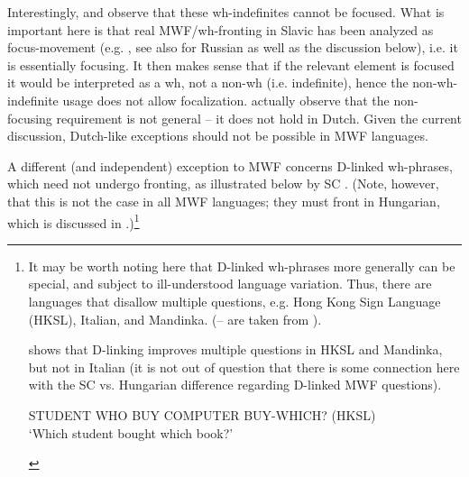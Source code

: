 \documentclass[output=paper,colorlinks,citecolor=brown]{langscibook}
\begin{document}
Interestingly, \citet{Zanon2022} and \citet{HengeveldRoelofsen2023} observe that these wh-indefinites cannot be focused. What is important here is that real MWF/wh-fronting in Slavic has been analyzed as focus-movement (e.g. \citealt{Bošković2002}, see also \citealt{Stepanov1998} for Russian as well as the discussion below), i.e. it is essentially focusing. It then makes sense that if the relevant element is focused it would be interpreted as a wh, not a non-wh (i.e. indefinite), hence the non-wh-indefinite usage does not allow focalization. \citet{HengeveldRoelofsen2023} actually observe that the non-focusing requirement is not general -- it does not hold in Dutch. Given the current discussion, Dutch-like exceptions should not be possible in MWF languages.

A different (and independent) exception to MWF concerns D-linked wh-phrases, which need not undergo fronting, as illustrated below by SC . (Note, however, that this is not the case in all MWF languages; they must front in Hungarian, which is discussed in .)\footnote{It
    may be worth noting here that D-linked wh-phrases more generally can be special, and subject to ill-understood language variation. Thus, there are languages that disallow multiple questions, e.g. Hong Kong Sign Language (HKSL), Italian, and Mandinka. (-- are taken from \citealt{Gan2022}).

    \label{ex:bosk:hksla}
    \z

    \label{ex:bosk:ita}
    \z

    \noindent \citet{Gan2022} shows that D-linking improves multiple questions in HKSL and Mandinka, but not in Italian (it is not out of question that there is some connection here with the SC vs. Hungarian difference regarding D-linked MWF questions).

    \ea
    STUDENT WHO BUY COMPUTER BUY-WHICH? \hfill (HKSL)\\
    `Which student bought which book?'\label{ex:bosk:hkslb}
    \z

    \label{ex:bosk:itb}
    \z\medskip
}
\end{document}
